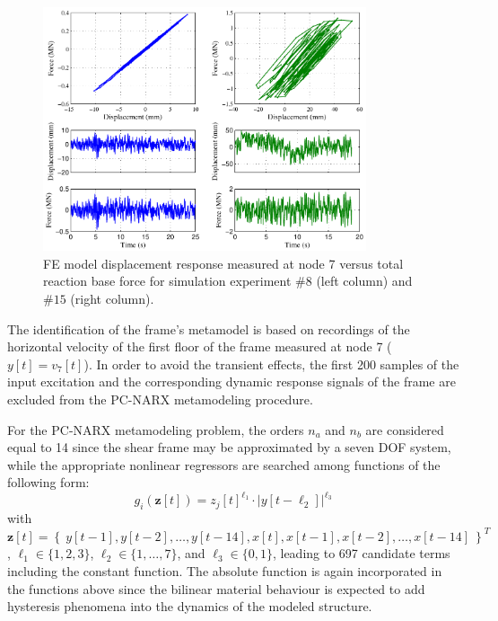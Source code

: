 \documentclass[preprint,3p,review,times,11pt]{elsarticle}
\newcommand{\bld}[1]{\boldsymbol{#1}}
\begin{document}
\begin{figure}[t!]
\begin{center}
\includegraphics[width = 0.85\textwidth]{figs/SF_randexci.pdf}
\caption{FE model displacement response measured at node 7 versus total reaction base force for simulation experiment $\#8$ (left column) and $\#15$ (right column). \label{fig:SF_randexc}}
\end{center}
\end{figure}


The identification of the frame's metamodel is based on recordings of the horizontal velocity of the first floor of the frame measured at node 7 ($y[t] = v_{7}[t] $). In order to avoid the transient effects, the first 200 samples of the input excitation and the corresponding dynamic response signals of the frame are excluded from the PC-NARX metamodeling procedure.  

For the PC-NARX metamodeling problem, the orders $n_a$ and  $n_b$ are considered equal to 14 since the shear frame may be approximated by a seven DOF system, while the appropriate nonlinear regressors are searched among functions of the following form: 
%
$$ g_i({\bld z}[t]) = z_{j}[t]^{\ell_1} \cdot |y[t - \ell_2]|^{\ell_3}$$
%  
with ${\bld z}[t] = \left\{ \ y[t-1], y[t-2],\ldots,y[t-14], x[t], x[t-1],x[t-2] ,\ldots, x[t-14]\ \right\}^{T}$, $\ell_1 \in \{1,2,3\}$, $\ell_2 \in\{ 1,\ldots,7 \}$, and $\ell_3 \in\{ 0,1 \}$, leading to 697 candidate terms including the constant function. The absolute function is again incorporated in the functions above since the bilinear material behaviour is expected to add hysteresis phenomena into the dynamics of the modeled structure.  
\end{document}
